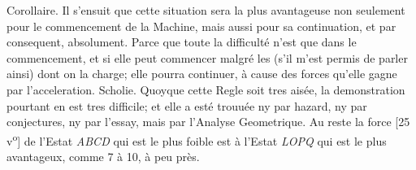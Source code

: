 \pstart  \centering {}Corollaire.
\pend 
\pstart \noindent Il s'ensuit que cette situation  sera la plus avantageuse non seulement  pour le commencement de la Machine\protect{}, mais aussi pour sa  continuation, et par consequent, absolument. Parce que toute  la difficult\'{e} n'est que dans le commencement, et si elle peut commencer malgr\'{e} les  (s'il m'est permis de parler ainsi)  dont on la charge;  elle pourra continuer, \`{a} cause des forces qu'elle gagne par l'acceleration. 
\pend 
\vspace{1em}
\pstart   \centering Scholie.
\pend 
\pstart \noindent Quoyque cette Regle\protect{} soit tres ais\'{e}e, la demonstration pourtant en est  tres difficile; et elle a est\'{e} trouu\'{e}e ny par hazard, ny par conjectures, ny par l'essay, mais par l'Analyse Geometrique.\protect{} Au reste la force [25 v\textsuperscript{o}] de l'Estat \textit{ABCD} qui est le plus foible est  \`{a} l'Estat \textit{LOPQ} qui est le plus avantageux, comme 7 \`{a} 10,  \`{a} peu pr\`{e}s. 
\pend
\count{}
\count{}


 
 


 


 


 



 


 


 


 


 


 


 


 


 


 

